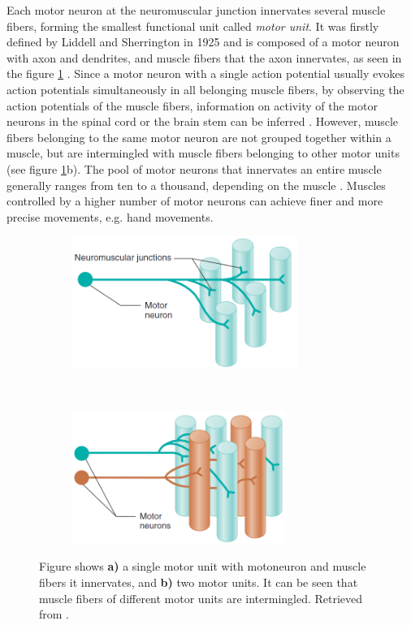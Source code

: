 Each motor neuron at the neuromuscular junction innervates several muscle fibers, forming the smallest functional unit called \emph{motor unit}. It was firstly defined by Liddell and Sherrington in 1925 \citep{Liddell1925, Sherrington1925} and is composed of a motor neuron with axon and dendrites, and muscle fibers that the axon innervates, as seen in the figure \ref{fig:motor units} \citep{Duchateau2011}. Since a motor neuron with a single action potential usually evokes action potentials simultaneously in all belonging muscle fibers, by observing the action potentials of the muscle fibers, information on activity of the motor neurons in the spinal cord or the brain stem can be inferred \citep{Merletti-Farina-book}. However, muscle fibers belonging to the same motor neuron are not grouped together within a muscle, but are intermingled with muscle fibers belonging to other motor units (see figure \ref{fig:motor units}b). The pool of motor neurons that innervates an entire muscle generally ranges from ten to a thousand, depending on the muscle \citep{Merletti-Farina-book}. Muscles controlled by a higher number of motor neurons can achieve finer and more precise movements, e.g. hand movements.
\begin{figure}[htb!]
    \centering
    \begin{subfigure}[t]{0.49\textwidth}
        \centering
        \includegraphics[height=1.7in]{Images/introduction/one_MU.png}
        \caption{}
    \end{subfigure}%
    ~ 
    \begin{subfigure}[t]{0.49\textwidth}
        \centering
        \includegraphics[height=1.7in]{Images/introduction/two_MU.png}
        \caption{}
    \end{subfigure}
    \caption{Figure shows \textbf{a)} a single motor unit with motoneuron and muscle fibers it innervates, and \textbf{b)} two motor units. It can be seen that muscle fibers of different motor units are intermingled. Retrieved from \citet{Widmaier2014}.}
\label{fig:motor units}
\end{figure}


